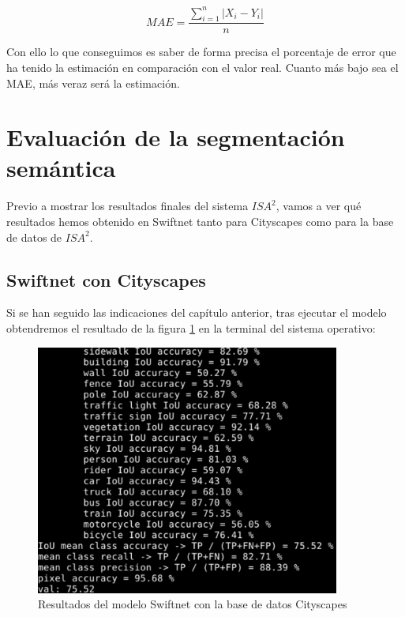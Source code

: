 \begin{equation}\label{eq:mae}
MAE = \frac{\sum_{i=1}^{n}|X_i - Y_i|}{n}
\end{equation}

Con ello lo que conseguimos es saber de forma precisa el porcentaje de error que ha tenido la estimación en comparación con el valor real. Cuanto más bajo sea el \ac{MAE}, más veraz será la estimación.
\section{Evaluación de la segmentación semántica}

Previo a mostrar los resultados finales del sistema $ISA^{2}$, vamos a ver qué resultados hemos obtenido en Swiftnet tanto para Cityscapes como para la base de datos de $ISA^{2}$.

\subsection{Swiftnet con Cityscapes}

Si se han seguido las indicaciones del capítulo anterior, tras ejecutar el modelo obtendremos el resultado de la figura \ref{fig:Res_Swift} en la terminal del sistema operativo:

\begin{figure}[H]
\centering
\includegraphics[width=10cm]{Figuras/Res_Swiftnet_Cityscapes.eps}
\caption{Resultados del modelo Swiftnet con la base de datos Cityscapes}
\label{fig:Res_Swift}
\end{figure}

